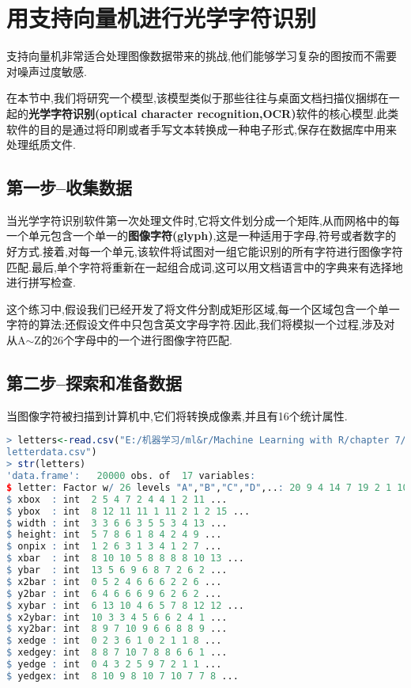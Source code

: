 \documentclass[11pt,a4paper,oneside]{book}
\begin{document}
\section{用支持向量机进行光学字符识别}
支持向量机非常适合处理图像数据带来的挑战,他们能够学习复杂的图按而不需要对噪声过度敏感.

在本节中,我们将研究一个模型,该模型类似于那些往往与桌面文档扫描仪捆绑在一起的\textbf{光学字符识别(optical character recognition,OCR)}软件的核心模型.此类软件的目的是通过将印刷或者手写文本转换成一种电子形式,保存在数据库中用来处理纸质文件.

\subsection{第一步--收集数据}
当光学字符识别软件第一次处理文件时,它将文件划分成一个矩阵,从而网格中的每一个单元包含一个单一的\textbf{图像字符(glyph)},这是一种适用于字母,符号或者数字的好方式.接着,对每一个单元,该软件将试图对一组它能识别的所有字符进行图像字符匹配.最后,单个字符将重新在一起组合成词,这可以用文档语言中的字典来有选择地进行拼写检查.

这个练习中,假设我们已经开发了将文件分割成矩形区域,每一个区域包含一个单一字符的算法;还假设文件中只包含英文字母字符.因此,我们将模拟一个过程,涉及对从A$\sim$Z的26个字母中的一个进行图像字符匹配.

\subsection{第二步--探索和准备数据}
当图像字符被扫描到计算机中,它们将转换成像素,并且有16个统计属性.

\begin{lstlisting}[language=r]
> letters<-read.csv("E:/机器学习/ml&r/Machine Learning with R/chapter 7/
letterdata.csv")
> str(letters)
'data.frame':	20000 obs. of  17 variables:
$ letter: Factor w/ 26 levels "A","B","C","D",..: 20 9 4 14 7 19 2 1 10 13 ...
$ xbox  : int  2 5 4 7 2 4 4 1 2 11 ...
$ ybox  : int  8 12 11 11 1 11 2 1 2 15 ...
$ width : int  3 3 6 6 3 5 5 3 4 13 ...
$ height: int  5 7 8 6 1 8 4 2 4 9 ...
$ onpix : int  1 2 6 3 1 3 4 1 2 7 ...
$ xbar  : int  8 10 10 5 8 8 8 8 10 13 ...
$ ybar  : int  13 5 6 9 6 8 7 2 6 2 ...
$ x2bar : int  0 5 2 4 6 6 6 2 2 6 ...
$ y2bar : int  6 4 6 6 6 9 6 2 6 2 ...
$ xybar : int  6 13 10 4 6 5 7 8 12 12 ...
$ x2ybar: int  10 3 3 4 5 6 6 2 4 1 ...
$ xy2bar: int  8 9 7 10 9 6 6 8 8 9 ...
$ xedge : int  0 2 3 6 1 0 2 1 1 8 ...
$ xedgey: int  8 8 7 10 7 8 8 6 6 1 ...
$ yedge : int  0 4 3 2 5 9 7 2 1 1 ...
$ yedgex: int  8 10 9 8 10 7 10 7 7 8 ...
\end{lstlisting}
\end{document}
